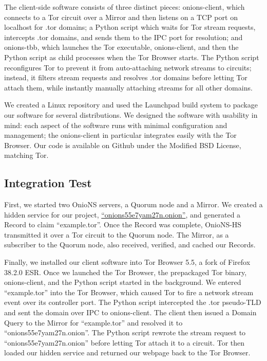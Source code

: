 \documentclass[conference]{IEEEtran}
\begin{document}
The client-side software consists of three distinct pieces: onions-client, which connects to a Tor circuit over a Mirror and then listens on a TCP port on localhost for .tor domains; a Python script which waits for Tor stream requests, intercepts .tor domains, and sends them to the IPC port for resolution; and onions-tbb, which launches the Tor executable, onions-client, and then the Python script as child processes when the Tor Browser starts. The Python script reconfigures Tor to prevent it from auto-attaching network streams to circuits; instead, it filters stream requests and resolves .tor domains before letting Tor attach them, while instantly manually attaching streams for all other domains.

We created a Linux repository and used the Launchpad build system to package our software for several distributions. We designed the software with usability in mind: each aspect of the software runs with minimal configuration and management; the onions-client in particular integrates easily with the Tor Browser. Our code is available on Github under the Modified BSD License, matching Tor.

\subsection{Integration Test}

First, we started two OnioNS servers, a Quorum node and a Mirror. We created a hidden service for our project, \href{http://onions55e7yam27n.onion}{``onions55e7yam27n.onion''}, and generated a Record to claim ``example.tor''. Once the Record was complete, OnioNS-HS transmitted it over a Tor circuit to the Quorum node. The Mirror, as a subscriber to the Quorum node, also received, verified, and cached our Records.

Finally, we installed our client software into Tor Browser 5.5, a fork of Firefox 38.2.0 ESR. Once we launched the Tor Browser, the prepackaged Tor binary, onions-client, and the Python script started in the background. We entered ``example.tor'' into the Tor Browser, which caused Tor to fire a network stream event over its controller port. The Python script intercepted the .tor pseudo-TLD and sent the domain over IPC to onions-client. The client then issued a Domain Query to the Mirror for ``example.tor'' and resolved it to ``onions55e7yam27n.onion''. The Python script rewrote the stream request to ``onions55e7yam27n.onion'' before letting Tor attach it to a circuit. Tor then loaded our hidden service and returned our webpage back to the Tor Browser.
\end{document}
